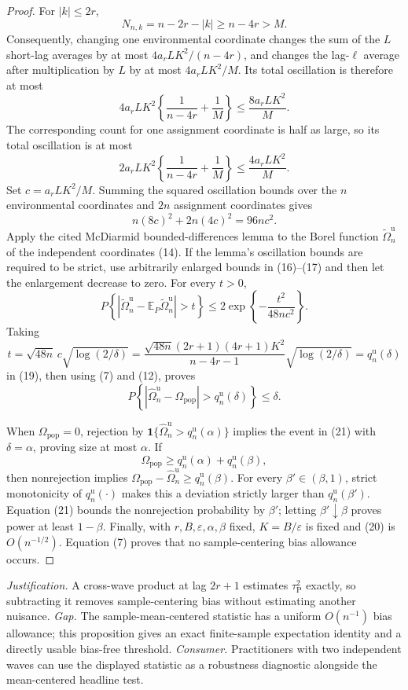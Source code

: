 \documentclass{article}
\begin{document}
\begin{proof}
For \(|k|\le2r\),
\[
 N_{n,k}=n-2r-|k|\ge n-4r>M. \tag{15}
\]
Consequently, changing one environmental coordinate changes the sum of the \(L\) short-lag averages by at most \(4a_rLK^2/(n-4r)\), and changes the lag-\(\ell\) average after multiplication by \(L\) by at most \(4a_rLK^2/M\).  Its total oscillation is therefore at most
\[
 4a_rLK^2\left\{\frac{1}{n-4r}+\frac{1}{M}\right\}
 \le \frac{8a_rLK^2}{M}. \tag{16}
\]
The corresponding count for one assignment coordinate is half as large, so its total oscillation is at most
\[
 2a_rLK^2\left\{\frac{1}{n-4r}+\frac{1}{M}\right\}
 \le \frac{4a_rLK^2}{M}. \tag{17}
\]
Set \(c=a_rLK^2/M\).  Summing the squared oscillation bounds over the \(n\) environmental coordinates and \(2n\) assignment coordinates gives
\[
 n(8c)^2+2n(4c)^2=96nc^2. \tag{18}
\]
Apply the cited McDiarmid bounded-differences lemma to the Borel function \(\widetilde\Omega_n^{\mathrm u}\) of the independent coordinates (14).  If the lemma's oscillation bounds are required to be strict, use arbitrarily enlarged bounds in (16)--(17) and then let the enlargement decrease to zero.  For every \(t>0\),
\[
 P\!\left\{
  \left|\widetilde\Omega_n^{\mathrm u}
  -\mathbb E_P\widetilde\Omega_n^{\mathrm u}\right|>t
 \right\}
 \le 2\exp\!\left\{-\frac{t^2}{48nc^2}\right\}. \tag{19}
\]
Taking
\[
 t=\sqrt{48n}\,c\sqrt{\log(2/\delta)}
 =\frac{\sqrt{48n}(2r+1)(4r+1)K^2}{n-4r-1}
   \sqrt{\log(2/\delta)}
 =q_n^{\mathrm u}(\delta) \tag{20}
\]
in (19), then using (7) and (12), proves
\[
 P\!\left\{
  \left|\widehat\Omega_n^{\mathrm u}-\Omega_{\mathrm{pop}}\right|
  >q_n^{\mathrm u}(\delta)
 \right\}\le\delta. \tag{21}
\]

When \(\Omega_{\mathrm{pop}}=0\), rejection by
\(\mathbf 1\{\widehat\Omega_n^{\mathrm u}>q_n^{\mathrm u}(\alpha)\}\)
implies the event in (21) with \(\delta=\alpha\), proving size at most \(\alpha\).  If
\[
 \Omega_{\mathrm{pop}}
 \ge q_n^{\mathrm u}(\alpha)+q_n^{\mathrm u}(\beta), \tag{22}
\]
then nonrejection implies
\(\Omega_{\mathrm{pop}}-\widehat\Omega_n^{\mathrm u}\ge q_n^{\mathrm u}(\beta)\).
For every \(\beta'\in(\beta,1)\), strict monotonicity of \(q_n^{\mathrm u}(\cdot)\) makes this a deviation strictly larger than \(q_n^{\mathrm u}(\beta')\).  Equation (21) bounds the nonrejection probability by \(\beta'\); letting \(\beta'\downarrow\beta\) proves power at least \(1-\beta\).  Finally, with \(r,B,\varepsilon,\alpha,\beta\) fixed, \(K=B/\varepsilon\) is fixed and (20) is \(O(n^{-1/2})\).  Equation (7) proves that no sample-centering bias allowance occurs.
\end{proof}
\par\smallskip\noindent \textit{Justification.} A cross-wave product at lag \(2r+1\) estimates \(\tau_{\mathrm P}^2\) exactly, so subtracting it removes sample-centering bias without estimating another nuisance. \textit{Gap.} The sample-mean-centered statistic has a uniform \(O(n^{-1})\) bias allowance; this proposition gives an exact finite-sample expectation identity and a directly usable bias-free threshold. \textit{Consumer.} Practitioners with two independent waves can use the displayed statistic as a robustness diagnostic alongside the mean-centered headline test.
\end{document}
